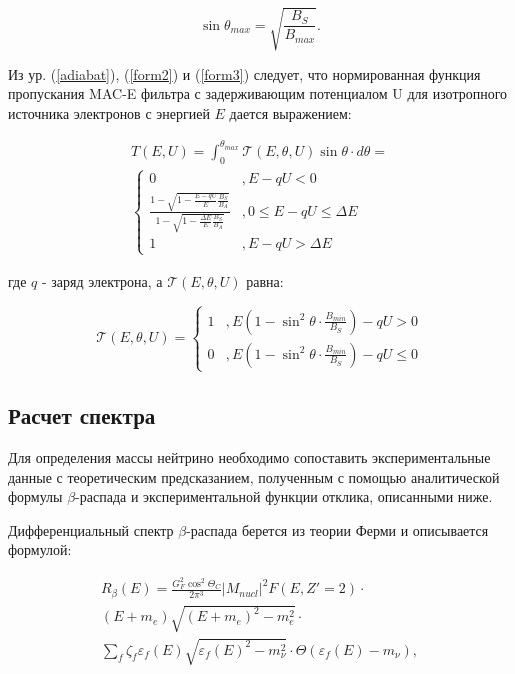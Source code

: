 \documentclass[a4paper,14pt]{extarticle}
\begin{document}
    \begin{equation}
        \label{form3}
        \sin \theta_{max} = \sqrt{\frac{B_S}{B_{max}}}.
    \end{equation}
    
    Из ур. (\ref{adiabat}), (\ref{form2}) и (\ref{form3}) следует, что нормированная функция пропускания MAC-E
    фильтра с задерживающим потенциалом U для изотропного источника электронов с энергией $E$ дается выражением:
    
    \begin{equation}
    \begin{split}
      T(E,U) = \int_{0}^{\theta_{max}} \mathcal T(E, \theta, U) \sin\theta\cdot d\theta = \\
      \begin{cases} 
        0 & , E - qU < 0 \\
        \frac{1 - \sqrt{1-\frac{E-qU}{E} \frac{B_{S}}{B_{A}}}}{1 - \sqrt{1-\frac{\Delta E}{E}\frac{B_{S}}{B_{A}}}} & , 0 \leq E-qU \leq \Delta E \\
        1 & , E - qU > \Delta E
      \end{cases}
    \end{split}
    \end{equation}
    
    \noindent где $q$ - заряд электрона, а $\mathcal T(E, \theta, U)$ равна: 
    
    \begin{equation}
      \mathcal T(E, \theta, U) = 
      \begin{cases}
        1 & , E(1-\sin^2 \theta \cdot \frac{B_{min}}{B_S}) -qU > 0 \\
        0 & , E(1-\sin^2 \theta \cdot \frac{B_{min}}{B_S}) -qU \leq 0
      \end{cases}
    \end{equation}
    
    
    \subsection{Расчет спектра}
    Для определения массы нейтрино необходимо сопоставить экспериментальные данные
    с теоретическим предсказанием, полученным с помощью аналитической формулы $\beta$-распада
    и экспериментальной функции отклика, описанными ниже.
    
    Дифференциальный спектр $\beta$-распада берется из теории Ферми и описывается
    формулой:
    
    \begin{equation}
      \label{beta}
      \begin{split}
        R_{\beta}(E) = \frac{G_F^2 \cos^2 \Theta_C}{2 \pi^3} |M_{nucl}|^2 F(E, Z'=2) \cdot \\
        (E + m_e) \sqrt{(E+m_e)^2-m_e^2} \cdot \\
        \displaystyle\sum_f \zeta_f \varepsilon_f(E) \sqrt{\varepsilon_f(E)^2-m_{\nu}^2} \cdot \Theta(\varepsilon_f(E)-m_{\nu}),
      \end{split}
    \end{equation}
    
\end{document}
